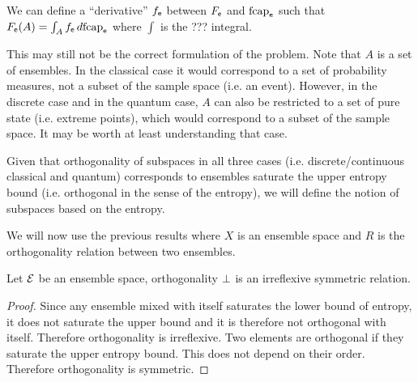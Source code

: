 \begin{conj}
	We can define a ``derivative'' $f_{\mathsf{e}}$ between $F_{\mathsf{e}}$ and $\mathrm{fcap}_{\mathsf{e}}$ such that $F_{\mathsf{e}}(A) = \int_A f_{\mathsf{e}} \, d \mathrm{fcap}_{\mathsf{e}}$ where $\int$ is the ??? integral.
\end{conj}

\begin{remark}
	This may still not be the correct formulation of the problem. Note that $A$ is a set of ensembles. In the classical case it would correspond to a set of probability measures, not a subset of the sample space (i.e. an event). However, in the discrete case and in the quantum case, $A$ can also be restricted to a set of pure state (i.e. extreme points), which would correspond to a subset of the sample space. It may be worth at least understanding that case.
\end{remark}



Given that orthogonality of subspaces in all three cases (i.e. discrete/continuous classical and quantum) corresponds to ensembles saturate the upper entropy bound (i.e. orthogonal in the sense of the entropy), we will define the notion of subspaces based on the entropy.

We will now use the previous results where $X$ is an ensemble space and $R$ is the orthogonality relation between two ensembles.

\begin{prop}
	Let $\mathcal{E}$ be an ensemble space, orthogonality $\perp$ is an irreflexive symmetric relation.
\end{prop}

\begin{proof}
	Since any ensemble mixed with itself saturates the lower bound of entropy, it does not saturate the upper bound and it is therefore not orthogonal with itself. Therefore orthogonality is irreflexive. Two elements are orthogonal if they saturate the upper entropy bound. This does not depend on their order. Therefore orthogonality is symmetric.
\end{proof}

